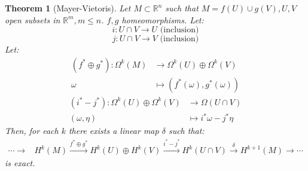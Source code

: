 \documentclass[a4paper,11pt,titlepage, article, oneside]{memoir}
\numberwithin{equation}{section}
\newtheorem{theorem}{Theorem}[section]
\theoremstyle{definition}
\theoremstyle{remark}
\newcommand{\rfield}{\mathbb{R}}
\begin{document}
\begin{theorem}[Mayer-Vietoris] \label{mvthm}
  Let $M \subset \rfield^n$ such that $M=f(U) \cup g(V), U, V$ open subsets in $\rfield^m, m \le n$. $f, g$ homeomorphisms.
  Let:
  $$i \colon U \cap V \rightarrow U \text{ (inclusion)}$$
  $$j \colon U \cap V \rightarrow V \text{ (inclusion)}$$
  Let:
  \begin{align*}
    (f^* \oplus g^*) \colon \Omega^k(M) &\rightarrow \Omega^k(U) \oplus \Omega^k(V) \\
    \omega &\mapsto (f^*(\omega), g^*(\omega))
  \end{align*}
  \begin{align*}
    (i^* - j^*) \colon \Omega^k(U) \oplus \Omega^k(V) &\rightarrow \Omega(U \cap V)\\
    (\omega, \eta) &\mapsto i^* \omega - j^* \eta
  \end{align*}
  Then, for each $k$ there exists a linear map $\delta$ such that:
  \begin{align*}
    \cdots \longrightarrow &H^k(M) \overset{f^* \oplus g^*}{\longrightarrow} H^k(U) \oplus H^k(V) \overset{i^* - j^*}{\longrightarrow} H^k(U \cap V) \overset{\delta}{\longrightarrow} H^{k+1}(M) \longrightarrow \cdots
  \end{align*}
  is exact.
\end{theorem}
\end{document}
